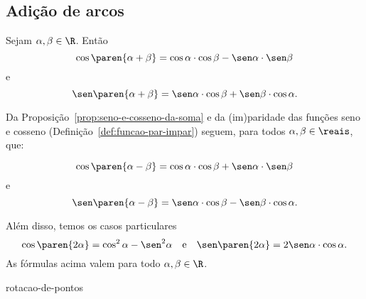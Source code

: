 \subsection{Adição de arcos}

\begin{proposition}
\label{prop:seno-e-cosseno-da-soma}
    Sejam $\alpha, \beta \in \R$. Então
$$\cos \paren{\alpha + \beta} = \cos \alpha \cdot \cos \beta - \sen
\alpha \cdot \sen \beta$$ e
$$\sen \paren{\alpha + \beta} = \sen \alpha \cdot \cos \beta +\sen \beta \cdot
\cos \alpha.$$
\end{proposition}

\begin{remark}
    Da Proposição~\ref{prop:seno-e-cosseno-da-soma} e da (im)paridade das funções seno e cosseno 
    (Definição~\ref{def:funcao-par-impar}) seguem, para todos $\alpha, \beta \in \reais$, que:

$$\cos \paren{\alpha - \beta} = \cos \alpha \cdot \cos \beta + \sen
\alpha \cdot \sen \beta$$ e
$$\sen \paren{\alpha - \beta} = \sen \alpha \cdot \cos \beta - \sen \beta \cdot
\cos \alpha.$$

Além disso, temos os casos particulares
$$\cos \paren{2\alpha } = \cos^2 \alpha  - \sen^2 \alpha \ \ \text{ e }
\ \ \sen \paren{2\alpha } = 2\sen \alpha \cdot \cos \alpha.$$ As
fórmulas acima valem para todo $\alpha, \beta \in \R$.
\end{remark}

{rotacao-de-pontos}